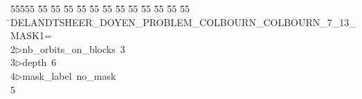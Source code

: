%
%
\begin{tabbing}
55555 \= 55 \= 55 \= 55 \= 55 \= 55 \= 55 \= 55 \= 55 \= 55 \= 55 \= 55 \= 55 \= \>DELANDTSHEER\_DOYEN\_PROBLEM\_COLBOURN\_COLBOURN\_7\_13\_MASK1=\\[0pt]
2\>$\triangleright$\>nb\_orbits\_on\_blocks\ 3\ \\[0pt]
3\>$\triangleright$\>depth\ 6\ \\[0pt]
4\>$\triangleright$\>mask\_label\ no\_mask\\[0pt]
5\>\end{tabbing}
